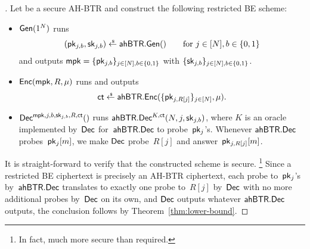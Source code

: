 \begin{proof}[]
Let
be a secure AH-BTR and
construct the following restricted BE scheme:
\begin{itemize}
\item $\Gen(1^N)$ runs
\begin{align*}
(\pk_{j,b},\sk_{j,b})\draws\AHBTR.\Gen()\qquad\textup{for }j\in[N],b\in\bit
\end{align*}
and outputs ${\mpk=\{\pk_{j,b}\}_{j\in[N],b\in\bit}}$ with $\{\sk_{j,b}\}_{j\in[N],b\in\bit}$.
\item $\Enc(\mpk,R,\mu)$ runs and outputs
\begin{align*}
\ct\draws\AHBTR.\Enc(\{\pk_{j,R[j]}\}_{j\in[N]},\mu).
\end{align*}
\item $\Dec^{\mpk,j,b,\sk_{j,b},R,\ct}()$
runs $\AHBTR.\Dec^{K,\ct}(N,j,\sk_{j,b})$,
where $K$ is an oracle implemented by~$\Dec$ for~$\AHBTR.\Dec$ to probe~$\pk_j$'s.
Whenever $\AHBTR.\Dec$ probes~$\pk_j[m]$,
we make $\Dec$ probe~$R[j]$ and answer~$\pk_{j,R[j]}[m]$.
\end{itemize}
It is straight-forward to verify that the constructed scheme is secure.%
\footnote{In fact, much more secure than required.}
Since
a restricted BE ciphertext is precisely an AH-BTR ciphertext,
each probe to~$\pk_j$'s by~$\AHBTR.\Dec$ translates to exactly one probe to~$R[j]$ by~$\Dec$ with no more additional probes by~$\Dec$ on its own, and
$\Dec$ outputs whatever $\AHBTR.\Dec$ outputs,
the conclusion follows by Theorem~\ref{thm:lower-bound}.
\end{proof}
